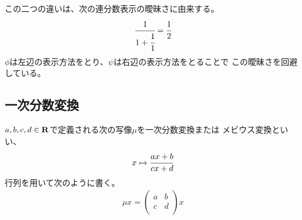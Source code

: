 	この二つの違いは、次の連分数表示の曖昧さに由来する。
	\begin{equation*}\begin{split}
		\cfrac{1}{1 + \cfrac{1}{1}} = \cfrac{1}{2}
	\end{split}\end{equation*}
	$\phi$は左辺の表示方法をとり、$\psi$は右辺の表示方法をとることで
	この曖昧さを回避している。
\subsection{一次分数変換}\label{s2:一次分数変換} %
	\begin{definition}[一次分数変換]\label{def:一次分数変換} %
		$a,b,c,d\in\mathbf{R}$で定義される次の写像$\mu$を一次分数変換または
		メビウス変換といい、
		\begin{equation*}\begin{split}
			x \mapsto \cfrac{ax+b}{cx+d}
		\end{split}\end{equation*}
		行列を用いて次のように書く。
		\begin{equation*}\begin{split}
			\mu x = \begin{pmatrix}
				a & b \\
				c & d \\
			\end{pmatrix}x
		\end{split}\end{equation*}
	\end{definition} %

